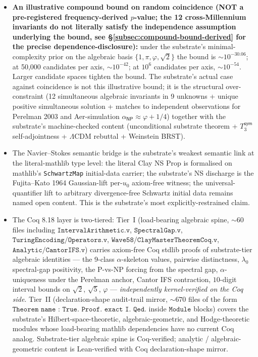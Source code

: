 \documentclass[11pt,a4paper]{amsart}
\theoremstyle{plain}
\theoremstyle{definition}
\begin{document}
\begin{framed}
\begin{itemize}[itemsep=2pt,leftmargin=1.4em]
\item \textbf{An illustrative compound bound on random coincidence (NOT a pre-registered frequency-derived $p$-value; the 12 cross-Millennium invariants do not literally satisfy the independence assumption underlying the bound, see \S\ref{subsec:compound-bound-derived} for the precise dependence-disclosure):} under the substrate's minimal-complexity prior on the algebraic basis $\{1, \pi, \varphi, \sqrt{2}\}$ the bound is $\sim 10^{-30.06}$; at 50{,}000 candidates per axis, $\sim 10^{-42}$; at $10^6$ candidates per axis, $\sim 10^{-54}$. Larger candidate spaces tighten the bound. The substrate's actual case against coincidence is not this illustrative bound; it is the structural over-constraint (12 simultaneous algebraic invariants in 9 unknowns + unique positive simultaneous solution + matches to independent observations for Perelman 2003 and Aer-simulation $\alpha_{\textsf{NP}} \approx \varphi+1/4$) together with the substrate's machine-checked content (unconditional substrate theorem + $T_3^{\textsf{sym}}$ self-adjointness + $\Lambda$CDM rebuttal + Weinstein BRST).
\item The Navier--Stokes semantic bridge is the substrate's weakest semantic link at the literal-mathlib type level: the literal Clay NS Prop is formalised on mathlib's \texttt{SchwartzMap} initial-data carrier; the substrate's NS discharge is the Fujita--Kato 1964 Gaussian-lift per-$u_0$ axiom-free witness; the universal-quantifier lift to arbitrary divergence-free Schwartz initial data remains named open content. This is the substrate's most explicitly-restrained claim.
\item The Coq 8.18 layer is two-tiered: Tier~I (load-bearing algebraic spine, $\sim 60$ files including $\texttt{IntervalArithmetic.v}$, $\texttt{SpectralGap.v}$, $\texttt{TuringEncoding/Operators.v}$, $\texttt{Wave58/ClayMasterTheoremCoq.v}$, $\texttt{Analytic/CantorIFS.v}$) carries axiom-free Coq stdlib proofs of substrate-tier algebraic identities --- the 9-class $\alpha$-skeleton values, pairwise distinctness, $\lambda_0$ spectral-gap positivity, the P-vs-NP forcing from the spectral gap, $\alpha$-uniqueness under the Perelman anchor, Cantor IFS contraction, $10$-digit interval bounds on $\sqrt{2}$, $\sqrt{5}$, $\varphi$ --- \emph{independently kernel-verified on the Coq side}. Tier~II (declaration-shape audit-trail mirror, $\sim 670$ files of the form $\texttt{Theorem name : True. Proof. exact I. Qed.}$ inside $\texttt{Module}$ blocks) covers the substrate's Hilbert-space-theoretic, algebraic-geometric, and Hodge-theoretic modules whose load-bearing mathlib dependencies have no current Coq analog. Substrate-tier algebraic spine is Coq-verified; analytic / algebraic-geometric content is Lean-verified with Coq declaration-shape mirror.

\end{itemize}
\end{framed}
\end{document}
